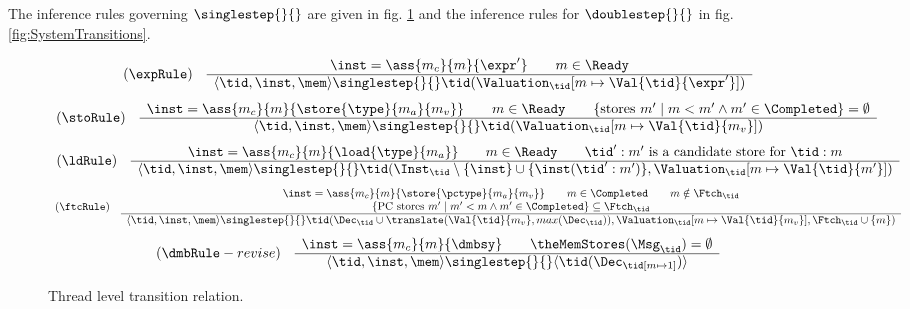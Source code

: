 The inference rules governing $\singlestep{}{}$ are given in fig. \ref{fig:ThreadTransitions} and the inference rules for $\doublestep{}{}$ in fig. \ref{fig:SystemTransitions}.
%
\begin{figure}
%
\[
\begin{array}{cc}
(\expRule)
&
\begin{array}{c}
\inst = \ass{m_c}{m}{\expr'} \qquad m\in\Ready \\ \hline
\langle \tid,\inst,\mem\rangle\singlestep{}{}
    \tid(\Valuation_\tid[m\mapsto\Val{\tid}{\expr'}])
\end{array}
\end{array}
\]
%
\[
\begin{array}{cc}
(\stoRule)
&
\begin{array}{c}
\inst = \ass{m_c}{m}{\store{\type}{m_a}{m_v}} \qquad
 m\in\Ready \qquad
 \{\mbox{stores }m'\mid m<m'\wedge m'\in\Completed\}=\emptyset 
 \\ \hline
\langle \tid,\inst,\mem\rangle
\singlestep{}{}
\tid(\Valuation_\tid[m\mapsto\Val{\tid}{m_v}])
\end{array}
\end{array}
\]
%
\[
\begin{array}{cc}
(\ldRule)
&
\begin{array}{c}
\inst=\ass{m_c}{m}{\load{\type}{m_a}} \qquad
m\in\Ready \qquad
\tid':m'\mbox{ is a candidate store for }\tid:m \\ \hline
\langle \tid,\inst,\mem\rangle
\singlestep{}{}
\tid(\Inst_\tid\setminus\{\inst\}\cup\{\inst(\tid':m')\},\Valuation_\tid[m\mapsto\Val{\tid}{m'}])
\end{array}
\end{array}
\]
\[
\begin{array}{cc}
(\ftcRule)
&
\begin{array}{c}
\inst= \ass{m_c}{m}{\store{\pctype}{m_a}{m_v}} \qquad
m\in\Completed \qquad
m\notin\Ftch_\tid \\
\{\mbox{PC stores }m'\mid m'<m\wedge m'\in\Completed\}\subseteq \Ftch_\tid
\\ \hline
\langle \tid,\inst,\mem\rangle
\singlestep{}{}
\tid(\Dec_\tid\cup \translate(\Val{\tid}{m_v}, max(\Dec_\tid)),
     \Valuation_\tid[m\mapsto\Val{\tid}{m_v}],
     \Ftch_\tid\cup\{m\})
\end{array}
\end{array}
\]
\[
\begin{array}{cc}
(\dmbRule - revise)
&
\begin{array}{c}
\inst = \ass{m_c}{m}{\dmbsy} \qquad
\theMemStores(\Msg_\tid) = \emptyset \\ \hline
\langle \tid,\inst,\mem\rangle \singlestep{}{}
\langle \tid(\Dec_\tid[m\mapsto 1])\rangle
\end{array}
\end{array}
\]
%
\caption{Thread level transition relation.}
\label{fig:ThreadTransitions}
\end{figure}

